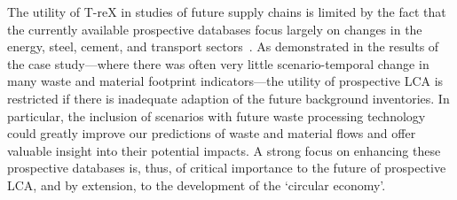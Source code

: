 The utility of T-reX in studies of future supply chains is limited by the fact that the currently available prospective databases focus largely on changes in the energy, steel, cement, and transport sectors~\citep{sacchi2023premisedocs}. As demonstrated in the results of the case study---where there was often very little scenario-temporal change in many waste and material footprint indicators---the utility of prospective LCA is restricted if there is inadequate adaption of the future background inventories. In particular, the inclusion of scenarios with future waste processing technology could greatly improve our predictions of waste and material flows and offer valuable insight into their potential impacts\citep{bisinella2024wastelca}. A strong focus on enhancing these prospective databases is, thus, of critical importance to the future of prospective LCA, and by extension, to the development of the `circular economy'. 
